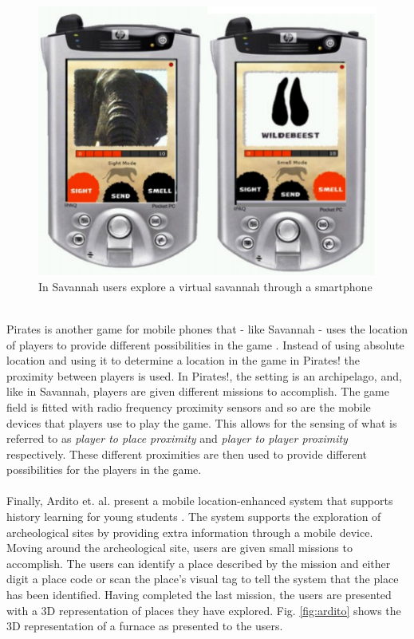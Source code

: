 \begin{figure}
	\centering
	\includegraphics[scale=0.6]{fig/savannah}
	\caption{In Savannah \cite{Benford_Rowland_Hull_Reid_Morrison_Facer_Clayton_2004} users explore a virtual savannah through a smartphone}
	\label{fig:savannah}
\end{figure}
\\
\noindent Pirates is another game for mobile phones that - like Savannah - uses the location of players to provide different possibilities in the game \cite{Falk:2001:PPI:634067.634140}. Instead of using absolute location and using it to determine a location in the game in Pirates! the proximity between players is used. In Pirates!, the setting is an archipelago, and, like in Savannah, players are given different missions to accomplish. The game field is fitted with radio frequency proximity sensors and so are the mobile devices that players use to play the game. This allows for the sensing of what is referred to as \emph{player to place proximity} and \emph{player to player proximity} respectively. These different proximities are then used to provide different possibilities for the players in the game.
\\\\
Finally, Ardito et. al. present a mobile location-enhanced system that supports history learning for young students \cite{4351331}. The system supports the exploration of archeological sites by providing extra information through a mobile device. Moving around the archeological site, users are given small missions to accomplish. The users can identify a place described by the mission and either digit a place code or scan the place's visual tag to tell the system that the place has been identified. Having completed the last mission, the users are presented with a 3D representation of places they have explored. Fig. \ref{fig:ardito} shows the 3D representation of a furnace as presented to the users.

